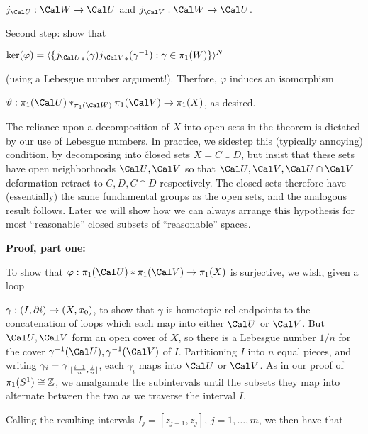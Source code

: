 \ssk

$j_{\Cal U}:{\Cal W}\ra {\Cal U}$ and $j_{\Cal V}:{\Cal W}\ra {\Cal U}$. 

\ssk

Second step: show that 

\ssk

$\ker(\varphi)=\langle \{{j_{\Cal U}}_*(\gamma){j_{\Cal V}}_*(\gamma^{-1}) : \gamma\in\pi_1(W)\}\rangle^N$

\ssk

(using a Lebesgue number argument!). Therfore, $\varphi$ induces an isomorphism

$\vartheta:\pi_1({\Cal U})*_{\pi_1({\Cal W})}\pi_1({\Cal V})\ra\pi_1(X)$, as desired.

\msk

The reliance upon a decomposition of $X$ into open sets in the theorem is dictated by our use of Lebesgue numbers. In practice,
we sidestep this (typically annoying) condition, by decomposing into \u{closed} sets $X=C\cup D$,
but insist that these sets have open neighborhoods ${\Cal U},{\Cal V}$ so that ${\Cal U},{\Cal V},{\Cal U}\cap{\Cal V}$
deformation retract to $C,D,C\cap D$ respectively. The closed sets therefore have (essentially)
the same fundamental groups as the open sets, and the analogous result follows.
Later we will show how we can always arrange this hypothesis for most ``reasonable''
closed subsets of ``reasonable'' spaces.

\vfill
\eject

{\bf Proof, part one:}

\msk

To show that $\varphi:\pi_1({\Cal U})*\pi_1({\Cal V})\ra\pi_1(X)$ is surjective, we wish, given a loop

$\gamma:(I,\partial i)\rightarrow(X,x_0)$, to show that $\gamma$ is homotopic rel endpoints to the concatenation of
loops which each map into either ${\Cal U}$ or ${\Cal V}$. But ${\Cal U},{\Cal V}$ form an open cover of $X$,
so there is a Lebesgue number $1/n$ for the cover $\gamma^{-1}({\Cal U}),\gamma^{-1}({\Cal V})$ of $I$.
Partitioning $I$ into $n$ equal pieces, and writing $\gamma_i=\gamma|_{[{{i-1}\over{n}},{{i}\over{n}}]}$,
each $\gamma_i$ maps into ${\Cal U}$ or ${\Cal V}$. As in our proof of $\pi_1(S^1)\cong {\Bbb Z}$, we amalgamate
the subintervals until the subsets they map into alternate between the two as we traverse the interval $I$.


\msk

Calling the resulting intervals $I_j=[z_{j-1},z_j]$, $j=1,\ldots,m$, we then have that 

